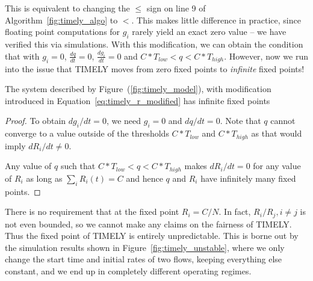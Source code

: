 \begin{figure*}[t]
\center
{}
\vspace{-1em}
\caption{Performance of two TIMELY flows under different starting conditions}
\label{fig:timely_unstable}
\vspace{-1em}
\end{figure*}

This is equivalent to changing the $\le$ sign on line 9 of
Algorithm~\ref{fig:timely_algo} to $<$. This makes little difference in
practice, since floating point computations for $g_i$ rarely yield an exact zero
value -- we have verified this via simulations. With this modification, we can
obtain the condition that with $g_i =0$, $\tfrac{dq}{dt} = 0$, $\tfrac{dg_i}{dt} =
0$ and $C*T_{low} < q < C*T_{high}$. However, now we run into the issue that
TIMELY moves from zero fixed points to \emph{infinite} fixed points!

\begin{thm}
The system described by Figure~(\ref{fig:timely_model}), with
modification introduced in Equation~\ref{eq:timely_r_modified} has
infinite fixed points
\end{thm}
\begin{proof}
To obtain ${dg_i}/{dt} =0$, we need $g_i = 0$ and ${dq}/{dt} = 0$.  Note that $q$
cannot converge to a value outside of the thresholds $ C*{T_{low}}$ and
$C*{T_{high}}$ as that would imply ${dR_i}/{dt} \ne 0$.

Any value of $q$ such that $C*T_{low} < q < C*T_{high}$ makes ${dR_i}/{dt} = 0$
for any value of $R_i$ as long as $\sum_{i} R_i(t) =  C$ and hence $q$
and $R_i$ have
infinitely many fixed points. 
\end{proof}

There is no requirement that at the fixed point $R_i = {C}/{N}$. In fact,
${R_{i}}/{R_{j}}, i \ne j$ is not even bounded, so we cannot make any
claims on the fairness of TIMELY. Thus the fixed point of TIMELY is entirely
unpredictable. This is borne out by the simulation results shown in
Figure~\ref{fig:timely_unstable}, where we only change the start time and
initial rates of two flows, keeping everything else constant, and we end up in
completely different operating regimes.

